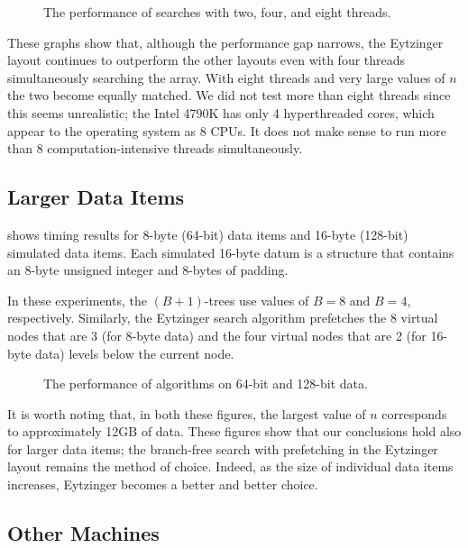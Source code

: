 \documentclass{patmorin}
\begin{document}
\begin{figure}
   \caption{The performance of searches with two, four, and eight threads.}
\end{figure}

These graphs show that, although the performance gap narrows, the
Eytzinger layout continues to outperform the other layouts even with four
threads simultaneously searching the array.  With eight threads and very
large values of $n$ the two become equally matched.  We did not test
more than eight threads since this seems unrealistic; the Intel 4790K
has only 4 hyperthreaded cores, which appear to the operating system as
8 CPUs. It does not make sense to run more than 8 computation-intensive
threads simultaneously.


\subsection{Larger Data Items}

 shows timing results for 8-byte (64-bit) data items and
16-byte (128-bit) simulated data items.  Each simulated 16-byte datum is a
structure that contains an 8-byte unsigned integer and 8-bytes of padding.

In these experiments, the $(B+1)$-trees use values of $B=8$ and $B=4$,
respectively. Similarly, the Eytzinger search algorithm prefetches the
8 virtual nodes that are 3 (for 8-byte data) and the four virtual nodes
that are 2 (for 16-byte data) levels below the current node.

\begin{figure}
   \caption{The performance of algorithms on 64-bit and 128-bit data.}
\end{figure}

It is worth noting that, in both these figures, the largest value of
$n$ corresponds to approximately 12GB of data. These figures show that
our conclusions hold also for larger data items; the branch-free search
with prefetching in the Eytzinger layout remains the method of choice.
Indeed, as the size of individual data items increases, Eytzinger becomes
a better and better choice.

\subsection{Other Machines}
\end{document}
